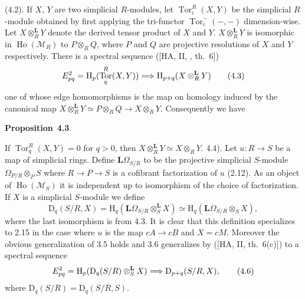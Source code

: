 \documentclass[10pt,reqno]{amsart}
\DeclareMathOperator{\Tor}{Tor}
\DeclareMathOperator{\Ho}{Ho}
\newenvironment{prop}[1]{
\par\medskip\noindent\textbf{Proposition}~\textbf{#1}.\,\itshape
}
\newcommand{\Lra}{\Longrightarrow}
\newcommand{\cat}{\mathcal}
\newcommand{\M}{\cat{M}}
\renewcommand{\L}{\mathbf{L}}
\renewcommand{\H}{\mathrm{H}}
\newcommand{\D}{\mathrm{D}}
\newcommand{\Diff}{\Omega}
\newcommand{\LD}{\L\Diff}
\begin{document}
(4.2). If $X$, $Y$ are two simplicial $R$-modules, let $\Tor_i^R(X,Y)$ be the simplicial $R$-module
obtained by first applying the tri-functor $\Tor_i^-(-,-)$ dimension-wise. Let $X\otimes_R^\L Y$ denote
the derived tensor product of $X$ and $Y$. $X\otimes_R^\L Y$ is isomorphic in $\Ho(\M_R)$ to
$P\otimes_R Q$, where $P$ and $Q$ are projective resolutions of $X$ and $Y$ respectively. There is a
spectral sequence ([HA, II, , th.~6])
\[
  E_{pq}^2=\H_p(\Tor_q^R(X,Y))\Lra\H_{p+q}(X\otimes_R^\L Y)\tag{4.3}
\]
one of whose edge homomorphisms is the map on homology induced by the canonical map
$X\otimes_R^\L Y\simeq P\otimes_R Q\to X\otimes_R Y$. Consequently we have

\begin{prop}{4.3}
If $\Tor_q^R(X,Y)=0$ for $q>0$, then $X\otimes_R^\L Y\simeq X\otimes_R Y$.
\end{prop}

(4.4). Let $u:R\to S$ be a map of simplicial rings. Define $\LD_{S/R}$ to be the projective
simplicial $S$-module $\Diff_{P/R}\otimes_P S$ where $R\to P\to S$ is a cofibrant factorization of $u$
(2.12). As an object of $\Ho(\M_S)$ it is independent up to isomorphism of the choice of factorization.
If $X$ is a simplicial $S$-module we define
\[
  \D_q(S/R,X)=\H_q(\LD_{S/R}\otimes_S^\L X)\simeq\H_q(\LD_{S/R}\otimes_S X),\tag{4.5}
\]
where the last isomorphism is from 4.3. It is clear that this definition specializes to 2.15
in the case where $u$ is the map $cA\to cB$ and $X=cM$. Moreover the obvious generalization of 3.5
holds and 3.6 generalizes by ([HA, II, th.~6(c)]) to a spectral sequence
\[
  E_{pq}^2=\H_p(\D_q(S/R)\otimes_S^\L X)\Lra\D_{p+q}(S/R,X),\tag{4.6}
\]
where $\D_q(S/R)=\D_q(S/R,S)$.
\end{document}
